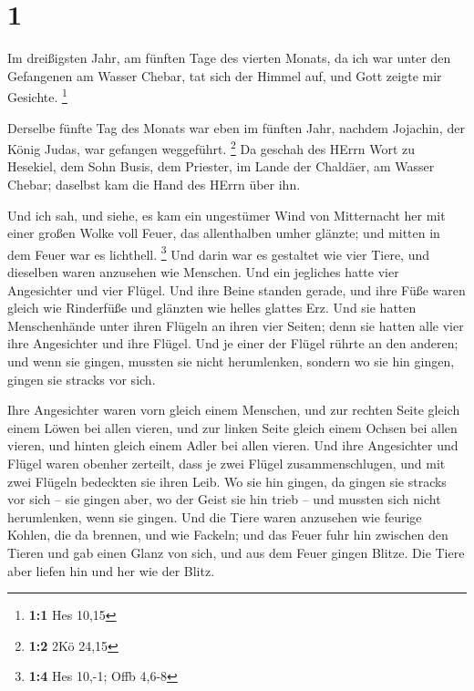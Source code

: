 \hypertarget{section}{%
\section{1}\label{section}}

 Im dreißigsten Jahr, am fünften Tage des vierten Monats, da
ich war unter den Gefangenen am Wasser Chebar, tat sich der Himmel auf,
und Gott zeigte mir Gesichte. \footnote{\textbf{1:1} Hes 10,15}

 Derselbe fünfte Tag des Monats war eben im fünften Jahr,
nachdem Jojachin, der König Judas, war gefangen weggeführt. \footnote{\textbf{1:2}
  2Kö 24,15}  Da geschah des HErrn Wort zu Hesekiel, dem
Sohn Busis, dem Priester, im Lande der Chaldäer, am Wasser Chebar;
daselbst kam die Hand des HErrn über ihn.

 Und ich sah, und siehe, es kam ein ungestümer Wind von
Mitternacht her mit einer großen Wolke voll Feuer, das allenthalben
umher glänzte; und mitten in dem Feuer war es lichthell. \footnote{\textbf{1:4}
  Hes 10,-1; Offb 4,6-8}  Und darin war es gestaltet wie
vier Tiere, und dieselben waren anzusehen wie Menschen.  Und
ein jegliches hatte vier Angesichter und vier Flügel.  Und
ihre Beine standen gerade, und ihre Füße waren gleich wie Rinderfüße und
glänzten wie helles glattes Erz.  Und sie hatten
Menschenhände unter ihren Flügeln an ihren vier Seiten; denn sie hatten
alle vier ihre Angesichter und ihre Flügel.  Und je einer
der Flügel rührte an den anderen; und wenn sie gingen, mussten sie nicht
herumlenken, sondern wo sie hin gingen, gingen sie stracks vor sich.

 Ihre Angesichter waren vorn gleich einem Menschen, und zur
rechten Seite gleich einem Löwen bei allen vieren, und zur linken Seite
gleich einem Ochsen bei allen vieren, und hinten gleich einem Adler bei
allen vieren.  Und ihre Angesichter und Flügel waren
obenher zerteilt, dass je zwei Flügel zusammenschlugen, und mit zwei
Flügeln bedeckten sie ihren Leib.  Wo sie hin gingen, da
gingen sie stracks vor sich -- sie gingen aber, wo der Geist sie hin
trieb -- und mussten sich nicht herumlenken, wenn sie gingen.
 Und die Tiere waren anzusehen wie feurige Kohlen, die da
brennen, und wie Fackeln; und das Feuer fuhr hin zwischen den Tieren und
gab einen Glanz von sich, und aus dem Feuer gingen Blitze. 
Die Tiere aber liefen hin und her wie der Blitz.

